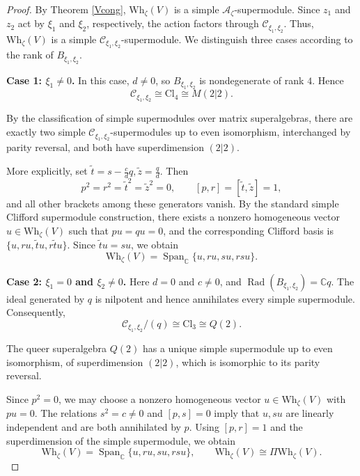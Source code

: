 \documentclass[a4paper,10pt]{article}
\theoremstyle{definition}
\theoremstyle{plain}
\theoremstyle{remark}
\theoremstyle{mystyle}
\numberwithin{equation}{section}
\begin{document}
\begin{proof}
    By Theorem \ref{Vcong}, \(\mathrm{Wh}_\zeta(V)\) is a simple \(\mathcal A_\zeta\)-supermodule. Since \(z_1\) and \(z_2\) act by \(\xi_1\) and \(\xi_2\), respectively, the action factors through \(\mathcal C_{\xi_1,\xi_2}\). Thus, \(\mathrm{Wh}_\zeta(V)\) is a simple \(\mathcal C_{\xi_1,\xi_2}\)-supermodule. We distinguish three cases according to the rank of \(B_{\xi_1,\xi_2}\).

\medskip

\noindent\textbf{Case 1: $\xi_1\neq 0$.}
In this case, \(d\neq0\), so \(B_{\xi_1,\xi_2}\) is nondegenerate of rank \(4\). Hence
\[
\mathcal C_{\xi_1,\xi_2}
\cong \mathrm{Cl}_4
\cong M(2|2).
\]

By the classification of simple supermodules over matrix superalgebras, there are exactly two simple \(\mathcal C_{\xi_1,\xi_2}\)-supermodules up to even isomorphism, interchanged by parity reversal, and both have superdimension \((2|2)\).

More explicitly, set $\widetilde t=s-\frac cdq,\widetilde z=\frac qd$. Then
\[
p^2=r^2=\widetilde t^2=\widetilde z^2=0,
\qquad
[p,r]=[\widetilde t,\widetilde z]=1,
\]
and all other brackets among these generators vanish. By the standard simple Clifford supermodule construction, there exists a nonzero homogeneous vector \(u\in \mathrm{Wh}_{\zeta}(V)\) such that $pu=qu=0$, and the corresponding Clifford basis is $\{u,ru,\widetilde tu,r\widetilde tu\}$. Since \(\widetilde tu=su\), we obtain
\[
\mathrm{Wh}_\zeta(V)
=
\operatorname{Span}_{\mathbb C}
\{u,ru,su,rsu\}.
\]

\medskip

\noindent\textbf{Case 2:
$\xi_1=0$ and $\xi_2\neq0$.}
Here \(d=0\) and \(c\neq0\), and $\operatorname{Rad}(B_{\xi_1,\xi_2})=\mathbb Cq$. 
The ideal generated by \(q\) is nilpotent and hence annihilates every simple supermodule. Consequently, 
\[
\mathcal C_{\xi_1,\xi_2}/(q)
\cong\mathrm{Cl}_3
\cong Q(2).
\]

The queer superalgebra \(Q(2)\) has a unique simple supermodule up to even isomorphism, of superdimension \((2|2)\), which is isomorphic to its parity reversal.

Since \(p^2=0\), we may choose a nonzero homogeneous vector \(u\in \mathrm{Wh}_{\zeta}(V)\) with \(pu=0\). The relations \(s^2=c\neq0\) and \([p,s]=0\) imply that \(u,su\) are linearly independent and are both annihilated by \(p\). Using \([p,r]=1\) and the superdimension of the simple supermodule, we obtain 
\[
\mathrm{Wh}_\zeta(V)
=
\operatorname{Span}_{\mathbb C}
\{u,ru,su,rsu\},
\qquad
\mathrm{Wh}_\zeta(V)\cong\Pi\mathrm{Wh}_\zeta(V).
\]


\end{proof}
\end{document}
